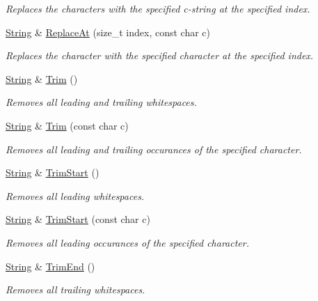 \begin{DoxyCompactItemize}
\begin{DoxyCompactList}\small\item\em Replaces the characters with the specified c-\/string at the specified index. \end{DoxyCompactList}\item 
\hyperlink{class_power_1_1_string}{String} \& \hyperlink{class_power_1_1_string_ad5c423d2d84539a6d9a203d2916d9851}{Replace\+At} (size\+\_\+t index, const char c)
\begin{DoxyCompactList}\small\item\em Replaces the character with the specified character at the specified index. \end{DoxyCompactList}\item 
\hyperlink{class_power_1_1_string}{String} \& \hyperlink{class_power_1_1_string_a5fb76a178082f7fc2533745941558452}{Trim} ()
\begin{DoxyCompactList}\small\item\em Removes all leading and trailing whitespaces. \end{DoxyCompactList}\item 
\hyperlink{class_power_1_1_string}{String} \& \hyperlink{class_power_1_1_string_a320511195a45fdb130083151a45bcf2d}{Trim} (const char c)
\begin{DoxyCompactList}\small\item\em Removes all leading and trailing occurances of the specified character. \end{DoxyCompactList}\item 
\hyperlink{class_power_1_1_string}{String} \& \hyperlink{class_power_1_1_string_a7c1c035836c4c42b4d6a118b7035742e}{Trim\+Start} ()
\begin{DoxyCompactList}\small\item\em Removes all leading whitespaces. \end{DoxyCompactList}\item 
\hyperlink{class_power_1_1_string}{String} \& \hyperlink{class_power_1_1_string_a1c0bda3a9e8ac38157413bcce1600d14}{Trim\+Start} (const char c)
\begin{DoxyCompactList}\small\item\em Removes all leading occurances of the specified character. \end{DoxyCompactList}\item 
\hyperlink{class_power_1_1_string}{String} \& \hyperlink{class_power_1_1_string_ac5607bfb0efda47bafa4271a7ce6a3a9}{Trim\+End} ()
\begin{DoxyCompactList}\small\item\em Removes all trailing whitespaces. \end{DoxyCompactList}\item 

\end{DoxyCompactItemize}
